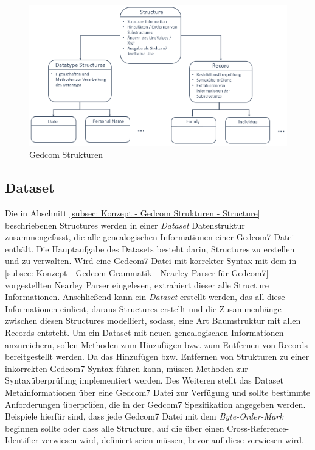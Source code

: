 \begin{figure}[h]
	\centering
	\includegraphics[width=1.0\textwidth]{images/konzept_structure.png}
	\caption{Gedcom Strukturen}
	\label{fig: Gedcom Strukturen}
\end{figure}

\subsection{Dataset}
\label{subsec: Konzept - Gedcom Strukturen - Dataset}
Die in Abschnitt \ref{subsec: Konzept - Gedcom Strukturen - Structure} beschriebenen Structures werden in einer \textit{Dataset} Datenstruktur zusammengefasst, die alle genealogischen Informationen einer Gedcom7 Datei enthält. Die Hauptaufgabe des Datasets besteht darin, Structures zu erstellen und zu verwalten. Wird eine Gedcom7 Datei mit korrekter Syntax mit dem in \ref{subsec: Konzept - Gedcom Grammatik - Nearley-Parser für Gedcom7} vorgestellten Nearley Parser eingelesen, extrahiert dieser alle Structure Informationen. Anschließend kann ein \textit{Dataset} erstellt werden, das all diese Informationen einliest, daraus Structures erstellt und die Zusammenhänge zwischen diesen Structures modelliert, sodass, eine Art Baumstruktur mit allen Records entsteht. Um ein Dataset mit neuen genealogischen Informationen anzureichern, sollen Methoden zum Hinzufügen bzw. zum Entfernen von Records bereitgestellt werden. Da das Hinzufügen bzw. Entfernen von Strukturen zu einer inkorrekten Gedcom7 Syntax führen kann, müssen Methoden zur Syntaxüberprüfung implementiert werden. Des Weiteren stellt das Dataset Metainformationen über eine Gedcom7 Datei zur Verfügung und sollte bestimmte Anforderungen überprüfen, die in der Gedcom7 Spezifikation angegeben werden. Beispiele hierfür sind, dass jede Gedcom7 Datei mit dem \textit{Byte-Order-Mark} beginnen sollte oder dass alle Structure, auf die über einen Cross-Reference-Identifier verwiesen wird, definiert seien müssen, bevor auf diese verwiesen wird. 
\newpage
